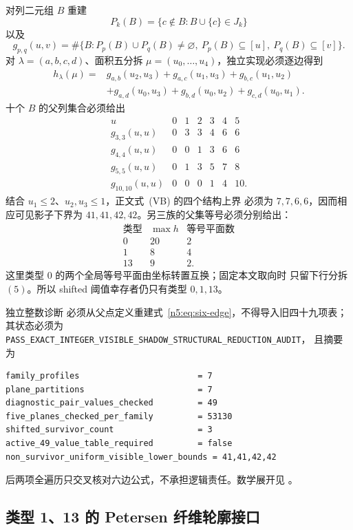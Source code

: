 对列二元组 \(B\) 重建
\[
P_k(B)=\{c\notin B:B\cup\{c\}\in J_k\}
\]
以及
\[
g_{p,q}(u,v)=\#\{B:P_p(B)\cup P_q(B)\ne\varnothing,\
P_p(B)\subseteq[u],\ P_q(B)\subseteq[v]\}.
\]
对 \(\lambda=(a,b,c,d)\)、面积五分拆
\(\mu=(u_0,\ldots,u_4)\)，独立实现必须逐边得到
\[
\begin{aligned}
h_\lambda(\mu)={}&g_{a,b}(u_2,u_3)+g_{a,c}(u_1,u_3)
 +g_{b,c}(u_1,u_2)\\
&+g_{a,d}(u_0,u_3)+g_{b,d}(u_0,u_2)+g_{c,d}(u_0,u_1).
\end{aligned}
\]
十个 \(B\) 的父列集合必须给出
\[
\begin{array}{c|rrrrrr}
u&0&1&2&3&4&5\\ \hline
g_{3,3}(u,u)&0&3&3&4&6&6\\
g_{4,4}(u,u)&0&0&1&3&6&6\\
g_{5,5}(u,u)&0&1&3&5&7&8\\
g_{10,10}(u,u)&0&0&0&1&4&10.
\end{array}
\]
结合 \(u_1\le2\)、\(u_2,u_3\le1\)，正文式~(VB) 的四个结构上界
必须为 \(7,7,6,6\)，因而相应可见影子下界为
\(41,41,42,42\)。另三族的父集等号必须分别给出：
\[
\begin{array}{c|c|c}
\text{类型}&\max h&\text{等号平面数}\\ \hline
0&20&2\\
1&8&4\\
13&9&2.
\end{array}
\]
这里类型 \(0\) 的两个全局等号平面由坐标转置互换；固定本文取向时
只留下行分拆 \((5)\)。所以 shifted 阈值幸存者仍只有类型
\(0,1,13\)。

独立整数诊断
必须从父点定义重建式~\eqref{n5:eq:six-edge}，不得导入旧四十九项表；
其状态必须为
\texttt{PASS\_EXACT\_INTEGER\_VISIBLE\_SHADOW\_STRUCTURAL\_REDUCTION\_AUDIT}，
且摘要为
\begin{verbatim}
family_profiles                        = 7
plane_partitions                       = 7
diagnostic_pair_values_checked         = 49
five_planes_checked_per_family         = 53130
shifted_survivor_count                 = 3
active_49_value_table_required         = false
non_survivor_uniform_visible_lower_bounds = 41,41,42,42
\end{verbatim}
后两项全遍历只交叉核对六边公式，不承担逻辑责任。数学展开见
。

\subsection{类型 1、13 的 Petersen 纤维轮廓接口}

